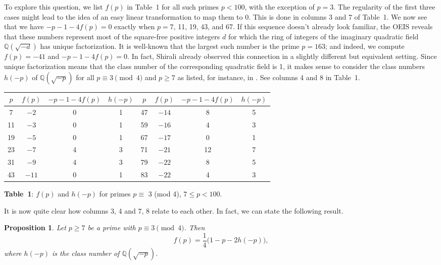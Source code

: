 \documentclass{amsart}
\theoremstyle{plain}
\newtheorem{proposition}[theorem]{Proposition}
\numberwithin{equation}{section}
\begin{document}
To explore this question, we list $f(p)$ in Table~1 for all such primes $p<100$,
with the exception of $p=3$. The regularity of the first three cases might lead
to the idea of an easy linear transformation to map them to 0.
This is done in columns 3 and 7 of Table~1. We now see that we have
$-p-1-4f(p)=0$ exactly when $p=7$, 11, 19, 43, and 67. If this sequence doesn't
already look familiar, the OEIS \cite{OEIS} reveals that these numbers represent
most of the square-free positive integers $d$ for which the ring of integers of
the imaginary quadratic field ${\mathbb Q}(\sqrt{-d})$ has unique factorization.
It is well-known that the largest such number is the prime $p=163$; and indeed,
we compute $f(p)=-41$ and $-p-1-4f(p)=0$. In fact, Shirali \cite[p.~270]{Sh} 
already observed this connection in a slightly different but equivalent 
setting. Since unique factorization means that the class number of the 
corresponding quadratic field is 1, it makes sense to consider the class 
numbers $h(-p)$ of ${\mathbb Q}(\sqrt{-p})$ for all $p\equiv 3\pmod{4}$ and
$p\geq 7$ as listed, for instance, in \cite[p.~425]{BS}. See columns 4 and 8
in Table~1.

\bigskip
\begin{center}
\begin{tabular}{|c|c|c|c||c|c|c|c|}
\hline
$p$ & $f(p)$ & $-p-1-4f(p)$ & $h(-p)$ & $p$ & $f(p)$ & $-p-1-4f(p)$ & $h(-p)$\\
\hline
7 & $-2$ & 0 & 1 & 47 & $-14$ & 8 & 5 \\
11 & $-3$ & 0 & 1 & 59 & $-16$ & 4 & 3 \\
19 & $-5$ & 0 & 1 & 67 & $-17$ & 0 & 1 \\
23 & $-7$ & 4 & 3 & 71 & $-21$ & 12 & 7 \\
31 & $-9$ & 4 & 3 & 79 & $-22$ & 8 & 5 \\
43 & $-11$& 0 & 1 & 83 & $-22$ & 4 & 3 \\
\hline
\end{tabular}

\medskip
{\bf Table~1}: $f(p)$ and $h(-p)$ for primes $p\equiv$ 3 (mod 4), $7\leq p<100$.
\end{center}
\bigskip

It is now quite clear how columns 3, 4 and 7, 8 relate to each other. In fact,
we can state the following result.

\begin{proposition}\label{prop:1.2}
Let $p\geq 7$ be a prime with $p\equiv3\pmod{4}$. Then
\begin{equation}\label{1.6}
f(p) = \frac{1}{4}\big(1-p-2h(-p)\big),
\end{equation}
where $h(-p)$ is the class number of ${\mathbb Q}(\sqrt{-p})$.
\end{proposition}
\end{document}
